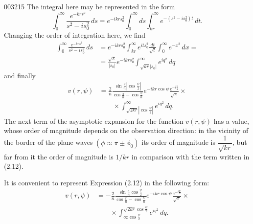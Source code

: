 \begin{scanpage}{0032}{15}
The integral here may be represented in the form
\[\int_0^\infty\frac{e^{-krs^2}}{s^2-is_0^2}\,ds=e^{-ikrs_0^2}\int_0^\infty ds\int_{kr}^\infty e^{-(s^2-is_0^2)t}\,dt.\]
Changing the order of integration here, we find
\[\begin{aligned}\int_0^\infty\frac{e^{-krs^2}}{s^2-is_0^2}\,ds&=e^{-ikrs_0^2}\int_{kr}^\infty e^{its_0^2}\frac{dt}{\sqrt t}\int_0^\infty e^{-x^2}\,dx=\\&=\frac{\sqrt\pi}{|s_0|}e^{-ikrs_0^2}\int_{\sqrt{kr}|s_0|}^\infty e^{iq^2}\,dq\end{aligned}\tag{2.11}\]
and finally
\[\begin{aligned}v(r,\psi)&=\frac2n\frac{\sin\frac\pi n\left|\cos\frac\psi2\right|}{\cos\frac\pi n-\cos\frac\psi n}e^{-ikr\cos\psi}\frac{e^{-i\frac\pi4}}{\sqrt\pi}\times\\&\qquad\times\int_{\sqrt{2kr}\left|\cos\frac\psi2\right|}^{\infty}e^{iq^2}\,dq.\end{aligned}\tag{2.12}\]
The next term of the asymptotic expansion for the function $v(r,\psi)$ has a value, whose order of magnitude depends on the observation direction: in the vicinity of the border of the plane waves $(\phi\approx\pi\pm\phi_0)$ its order of magnitude is $\dfrac1{\sqrt{kr}}$, but far from it the order of magnitude is $1/kr$ in comparison with the term written in (2.12).

It is convenient to represent Expression (2.12) in the following form:
\[\begin{aligned}v(r,\psi)&=-\frac2n\frac{\sin\frac\pi n\cos\frac\psi2}{\cos\frac\pi n-\cos\frac\psi n}e^{-ikr\cos\psi}\frac{e^{-i\frac\pi4}}{\sqrt\pi}\times\\&\qquad\times\int_{\infty\cos\frac\psi2}^{\sqrt{2kr}\cos\frac\psi2}e^{iq^2}\,dq.\end{aligned}\tag{2.13}\]
\end{scanpage}
